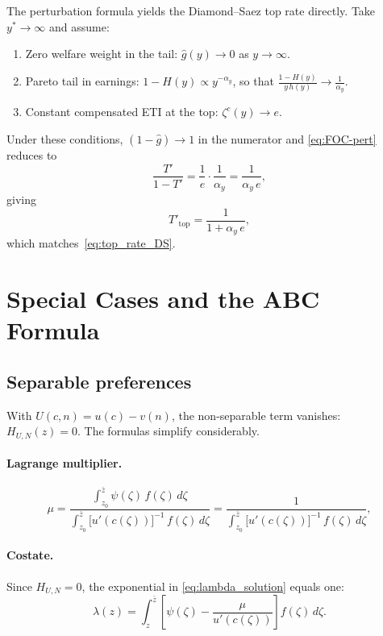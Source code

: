 \documentclass[12pt,a4paper]{article}
\theoremstyle{definition}
\theoremstyle{plain}
\theoremstyle{remark}
\newcommand{\zbar}{\bar{z}}
\newcommand{\zlow}{z_{\scriptscriptstyle 0}}
\begin{document}
The perturbation formula yields the Diamond--Saez top rate
directly. Take $y^*\to\infty$ and assume:
\begin{enumerate}[label=(\alph*)]
  \item Zero welfare weight in the tail:
    $\hat g(y)\to 0$ as $y\to\infty$.
  \item Pareto tail in earnings: $1-H(y)\propto y^{-\alpha_y}$,
    so that $\frac{1-H(y)}{y\,h(y)}\to\frac{1}{\alpha_y}$.
  \item Constant compensated ETI at the top:
    $\zeta^c(y)\to e$.
\end{enumerate}
Under these conditions, $(1-\hat g)\to 1$ in the numerator and
\eqref{eq:FOC-pert} reduces to
\[
  \frac{T'}{1-T'}
  = \frac{1}{e}\cdot\frac{1}{\alpha_y}
  = \frac{1}{\alpha_y\,e},
\]
giving
\[
  T'_{\text{top}} = \frac{1}{1+\alpha_y\,e},
\]
which matches~\eqref{eq:top_rate_DS}.

\section{Special Cases and the ABC Formula}
\label{sec:special}

\subsection{Separable preferences}

With $U(c,n) = u(c) - v(n)$, the non-separable term vanishes: $H_{U,N}(z) = 0$. The formulas simplify considerably.

\paragraph{Lagrange multiplier.}
\begin{equation}
\label{eq:mu_sep}
  \mu = \frac{\displaystyle\int_{\zlow}^{\zbar} \psi(\zeta) \, f(\zeta) \, d\zeta}
             {\displaystyle\int_{\zlow}^{\zbar} \bigl[u'(c(\zeta))\bigr]^{-1} \, f(\zeta) \, d\zeta}
  = \frac{1}{\displaystyle\int_{\zlow}^{\zbar} \bigl[u'(c(\zeta))\bigr]^{-1} \, f(\zeta) \, d\zeta},
\end{equation}

\paragraph{Costate.} Since $H_{U,N} = 0$, the exponential in \eqref{eq:lambda_solution} equals one:
\begin{equation}
\label{eq:lambda_sep}
  \lambda(z) = \int_{z}^{\zbar} \left[ \psi(\zeta) - \frac{\mu}{u'(c(\zeta))} \right] f(\zeta) \, d\zeta.
\end{equation}
\end{document}

